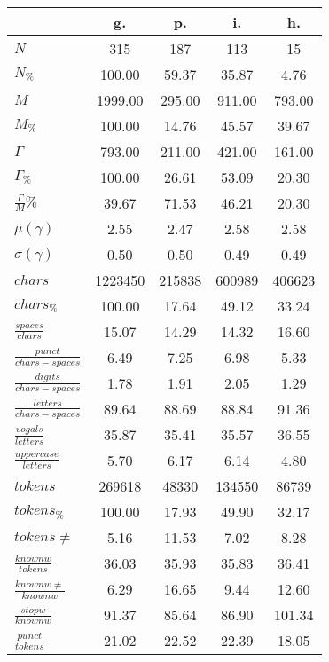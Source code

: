 \begin{table}[h!]
\begin{center}
\begin{tabular}{| l || c | c | c | c |}\hline
 & {\bf g.} & {\bf p.} & {\bf i.} & {\bf h.} \\\hline\hline
$N$ & 315  & 187  & 113  & 15 \\
$N_{\%}$ & 100.00  & 59.37  & 35.87  & 4.76 \\\hline
$M$ & 1999.00  & 295.00  & 911.00  & 793.00 \\
$M_{\%}$ & 100.00  & 14.76  & 45.57  & 39.67 \\\hline
$\Gamma$ & 793.00  & 211.00  & 421.00  & 161.00 \\
$\Gamma_{\%}$ & 100.00  & 26.61  & 53.09  & 20.30 \\\hline
$\frac{\Gamma}{M}\%$ & 39.67  & 71.53  & 46.21  & 20.30 \\
$\mu(\gamma)$ & 2.55  & 2.47  & 2.58  & 2.58 \\
$\sigma(\gamma)$ & 0.50  & 0.50  & 0.49  & 0.49 \\\hline\hline
$chars$ & 1223450  & 215838  & 600989  & 406623 \\
$chars_{\%}$ & 100.00  & 17.64  & 49.12  & 33.24 \\\hline
$\frac{spaces}{chars}$ & 15.07  & 14.29  & 14.32  & 16.60 \\
$\frac{punct}{chars-spaces}$ & 6.49  & 7.25  & 6.98  & 5.33 \\
$\frac{digits}{chars-spaces}$ & 1.78  & 1.91  & 2.05  & 1.29 \\\hline
$\frac{letters}{chars-spaces}$ & 89.64  & 88.69  & 88.84  & 91.36 \\
$\frac{vogals}{letters}$ & 35.87  & 35.41  & 35.57  & 36.55 \\
$\frac{uppercase}{letters}$ & 5.70  & 6.17  & 6.14  & 4.80 \\\hline\hline
$tokens$ & 269618  & 48330  & 134550  & 86739 \\
$tokens_{\%}$ & 100.00  & 17.93  & 49.90  & 32.17 \\
$tokens \neq$ & 5.16  & 11.53  & 7.02  & 8.28 \\\hline
$\frac{knownw}{tokens}$ & 36.03  & 35.93  & 35.83  & 36.41 \\
$\frac{knownw \neq}{knownw}$ & 6.29  & 16.65  & 9.44  & 12.60 \\\hline
$\frac{stopw}{knownw}$ & 91.37  & 85.64  & 86.90  & 101.34 \\
$\frac{punct}{tokens}$ & 21.02  & 22.52  & 22.39  & 18.05 \\

\end{tabular}
\end{center}
\end{table}
